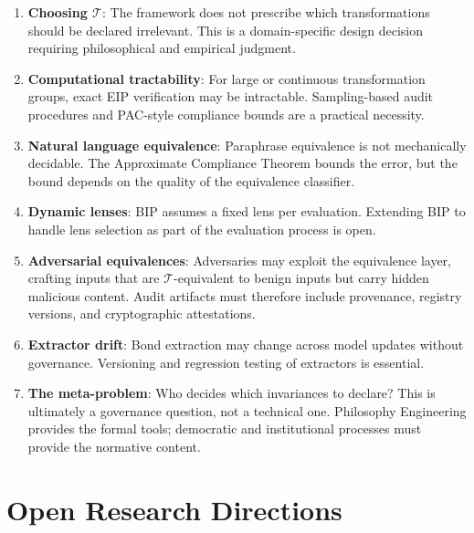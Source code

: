 \documentclass[12pt,letterpaper]{article}
\theoremstyle{definition}
\theoremstyle{plain}
\newcommand{\calT}{\mathcal{T}}
\begin{document}
\begin{enumerate}
    \item \textbf{Choosing $\calT$}: The framework does not prescribe which transformations should be declared irrelevant. This is a domain-specific design decision requiring philosophical and empirical judgment.

    \item \textbf{Computational tractability}: For large or continuous transformation groups, exact EIP verification may be intractable. Sampling-based audit procedures and PAC-style compliance bounds are a practical necessity.

    \item \textbf{Natural language equivalence}: Paraphrase equivalence is not mechanically decidable. The Approximate Compliance Theorem bounds the error, but the bound depends on the quality of the equivalence classifier.

    \item \textbf{Dynamic lenses}: BIP assumes a fixed lens per evaluation. Extending BIP to handle lens selection as part of the evaluation process is open.

    \item \textbf{Adversarial equivalences}: Adversaries may exploit the equivalence layer, crafting inputs that are $\calT$-equivalent to benign inputs but carry hidden malicious content. Audit artifacts must therefore include provenance, registry versions, and cryptographic attestations.

    \item \textbf{Extractor drift}: Bond extraction may change across model updates without governance. Versioning and regression testing of extractors is essential.

    \item \textbf{The meta-problem}: Who decides which invariances to declare? This is ultimately a governance question, not a technical one. Philosophy Engineering provides the formal tools; democratic and institutional processes must provide the normative content.
\end{enumerate}


\section{Open Research Directions}
\label{sec:open}
\end{document}
